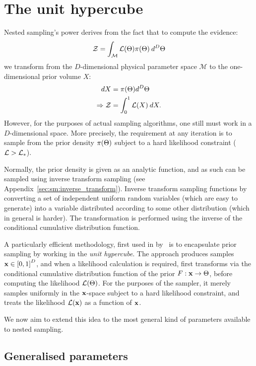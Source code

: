 \chapter{The unit hypercube}
\label{chap:hc}


Nested sampling's power derives from the fact that to compute the evidence:
\begin{equation}
  \mathcal{Z} = \int_\mathcal{M} \mathcal{L}(\Theta) \pi(\Theta)\: d^D\Theta
  \label{eqn:hc:evidence}
\end{equation}
we transform from the $D$-dimensional physical parameter space $\mathcal{M}$ to the one-dimensional prior volume $X$:
\begin{align}
  dX &= \pi(\Theta)d^D\Theta
  \label{eqn:hc:prior_vol_def} \\
  \Rightarrow \mathcal{Z} &= \int_0^1 \mathcal{L}(X) \: dX.
\end{align}
However, for the purposes of actual sampling algorithms, one still must work in a $D$-dimensional space. More precisely, the requirement at any iteration is to sample from the prior density $\pi(\Theta)$ subject to a hard likelihood constraint ($\mathcal{L}>\mathcal{L}_\ast$). 

Normally, the prior density is given as an analytic function, and as such can be sampled using inverse transform sampling (see Appendix~\ref{sec:sm:inverse_transform}). Inverse transform sampling functions by converting a set of independent uniform random variables (which are easy to generate) into a variable distributed according to some other distribution (which in general is harder). The transformation is performed using the inverse of the conditional cumulative distribution function. 

A particularly efficient methodology, first used in \MultiNest{} by~\cite{MultiNest2} is to encapsulate prior sampling by working in the {\em unit hypercube}. The approach produces samples $\mathbf{x}\in{[0,1]}^D$, and when a likelihood calculation is required, first transforms via the conditional cumulative distribution function of the prior $F:\mathbf{x}\to\Theta$, before computing the likelihood $\mathcal{L}(\Theta)$. For the purposes of the sampler, it merely samples uniformly in the $\mathbf{x}$-space subject to a hard likelihood constraint, and treats the likelihood $\mathcal{L}(\mathbf{x})$ as a function of $\mathbf{x}$.


We now aim to extend this idea to the most general kind of parameters available to nested sampling.

\section{Generalised parameters}
\label{sec:uh:generalised_parameters}

